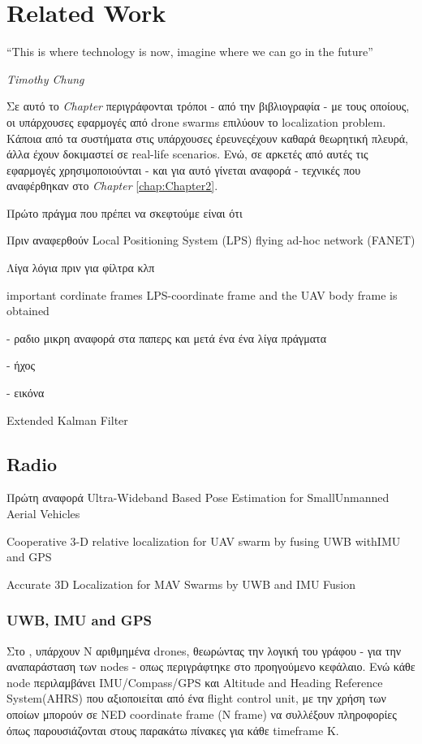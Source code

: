 \chapter{Related Work} \label{chap:Chapter3}       
\epigraph{``This is where technology is now, imagine where we can go in the future” }{\textit{Timothy Chung}}

Σε αυτό το \emph{Chapter} περιγράφονται τρόποι - από την βιβλιογραφία - με τους οποί\-ους, οι υπάρχουσες εφαρμογές 
από drone swarms επιλύουν το localization pro\-blem. Κάποια από τα συστήματα στις υπάρχουσες έρευνες\udot έχουν καθαρά
θεωρητική πλευρά, άλλα έχουν δοκιμαστεί σε real-life scenarios.
Ενώ, σε αρκετές από αυτές τις εφαρμογές χρησιμοποιούνται - 
και για αυτό γίνεται αναφορά - τεχνικές που αναφέ\-ρθηκαν στο \emph{Chapter} \ref{chap:Chapter2}.

Πρώτο πράγμα που πρέπει να σκεφτούμε είναι ότι 

Πριν αναφερθούν 
Local Positioning System (LPS)
flying ad-hoc network (FANET)

Λίγα λόγια πριν για φίλτρα κλπ

important cordinate frames
LPS-coordinate frame and
the UAV body frame is obtained

- ραδιο 
	μικρη αναφορά στα παπερς και μετά ένα ένα λίγα πράγματα

- ήχος

- εικόνα

Extended Kalman Filter

\section{Radio}


Πρώτη αναφορά \cite{uwb-imu-gps1} \cite{uwb-imu-gps2} \cite{uwb-imu-gps3}
Ultra-Wideband Based Pose Estimation for SmallUnmanned Aerial Vehicles

Cooperative 3-D relative localization for UAV swarm by fusing UWB withIMU and GPS

Accurate  3D  Localization  for  MAV  Swarms  by  UWB  and  IMU  Fusion

\subsection{UWB, IMU and GPS}
Στο \cite{uwb-imu-gps1}, υπάρχουν Ν αριθμημένα drones, θεωρώντας την λογική του γράφου - για την αναπαράσταση των nodes - οπως 
περιγράφτηκε στο προηγούμενο κεφάλαιο. Ενώ κάθε node περιλαμβάνει IMU/Compass/GPS και Αltitude and Heading Reference 
System(AHRS) που αξιοποιείται από ένα flight control unit, με την χρήση των οποίων μπορούν σε NED coordinate frame (N frame) να συλλέξουν πληροφορίες όπως παρουσιάζονται 
στους παρακάτω πίνακες για κάθε timeframe Κ.

